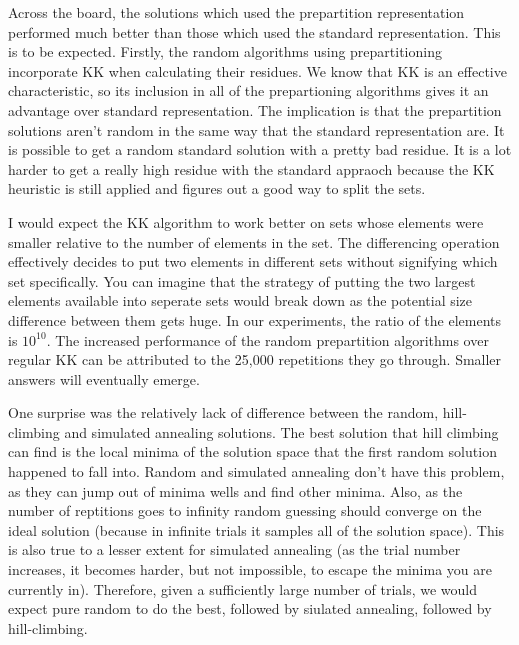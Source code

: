 \documentclass[solution, letterpaper]{cs124}
\begin{document}
\subsolution Across the board, the solutions which used the prepartition representation performed much better than those which used the standard representation. This is to be expected. Firstly, the random algorithms using prepartitioning incorporate KK when calculating their residues. We know that KK is an effective characteristic, so its inclusion in all of the prepartioning algorithms gives it an advantage over standard representation. The implication is that the prepartition solutions aren't random in the same way that the standard representation are. It is possible to get a random standard solution with a pretty bad residue. It is a lot harder to get a really high residue with the standard appraoch because the KK heuristic is still applied and figures out a good way to split the sets. 

I would expect the KK algorithm to work better on sets whose elements were smaller relative to the number of elements in the set. The differencing operation effectively decides to put two elements in different sets without signifying which set specifically. You can imagine that the strategy of putting the two largest elements available into seperate sets would break down as the potential size difference between them gets huge. In our experiments, the ratio of the elements is $10^10$. The increased performance of the random prepartition algorithms over regular KK can be attributed to the 25,000 repetitions they go through. Smaller answers will eventually emerge. 

One surprise was the relatively lack of difference between the random, hill-climbing and simulated annealing solutions. The best solution that hill climbing can find is the local minima of the solution space that the first random solution happened to fall into. Random and simulated annealing don't have this problem, as they can jump out of minima wells and find other minima. Also, as the number of reptitions goes to infinity random guessing should converge on the ideal solution (because in infinite trials it samples all of the solution space). This is also true to a lesser extent for simulated annealing (as the trial number increases, it becomes harder, but not impossible, to escape the minima you are currently in). Therefore, given a sufficiently large number of trials, we would expect pure random to do the best, followed by siulated annealing, followed by hill-climbing. 
\end{document}
